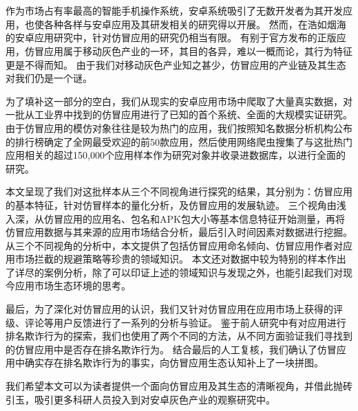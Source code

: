 
\chapter*{}
\vspace{-5mm}

\setlength{\baselineskip}{25pt} %

作为市场占有率最高的智能手机操作系统，安卓系统吸引了无数开发者为其开发应用，也使各种各样与安卓应用及其研发相关的研究得以开展。
然而，在浩如烟海的安卓应用研究中，针对仿冒应用的研究仍相当有限。
有别于官方发布的正版应用，仿冒应用属于移动灰色产业的一环，其目的各异，难以一概而论，其行为特征更是不得而知。
由于我们对移动灰色产业知之甚少，仿冒应用的产业链及其生态对我们仍是一个谜。

为了填补这一部分的空白，我们从现实的安卓应用市场中爬取了大量真实数据，对一批从工业界中找到的仿冒应用进行了已知的首个系统、全面的大规模实证研究。
由于仿冒应用的模仿对象往往是较为热门的应用，我们按照知名数据分析机构公布的排行榜确定了全网最受欢迎的前50款应用，然后使用网络爬虫搜集了与这批热门应用相关的超过150,000个应用样本作为研究对象并收录进数据库，以进行全面的研究。

本文呈现了我们对这批样本从三个不同视角进行探究的结果，其分别为：仿冒应用的基本特征，针对仿冒样本的量化分析，及仿冒应用的发展轨迹。
三个视角由浅入深，从仿冒应用的应用名、包名和APK包大小等基本信息特征开始测量，再将仿冒应用数据与其来源的应用市场结合分析，最后引入时间因素对数据进行挖掘。
从三个不同视角的分析中，本文提供了包括仿冒应用命名倾向、仿冒应用作者对应用市场拦截的规避策略等珍贵的领域知识。
本文还对数据中较为特别的样本作出了详尽的案例分析，除了可以印证上述的领域知识与发现之外，也能引起我们对现今应用市场生态环境的思考。

最后，为了深化对仿冒应用的认识，我们又针对仿冒应用在应用市场上获得的评级、评论等用户反馈进行了一系列的分析与验证。
鉴于前人研究中有对应用进行排名欺诈行为的探索，我们也使用了两个不同的方法，从不同方面验证我们寻找到的仿冒应用中是否存在排名欺诈行为。
结合最后的人工复核，我们确认了仿冒应用中确实存在排名欺诈行为的事实，向仿冒应用生态认知补上了一块拼图。

我们希望本文可以为读者提供一个面向仿冒应用及其生态的清晰视角，并借此抛砖引玉，吸引更多科研人员投入到对安卓灰色产业的观察研究中。

 
